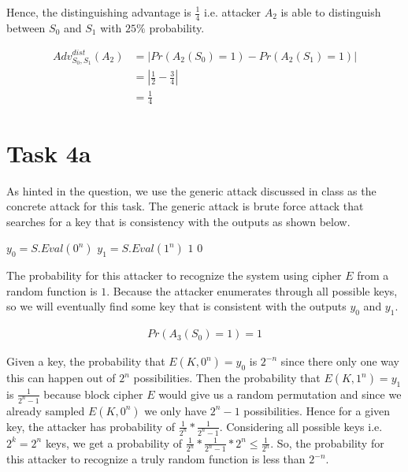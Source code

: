 \documentclass{article}
\begin{document}
    Hence, the distinguishing advantage is $\frac{1}{4}$ i.e. attacker $A_2$ is able to distinguish between $S_0$ and $S_1$ with $25\%$ probability.

    \begin{align*}
        Adv_{S_0,S_1}^{dist}(A_2)   & = |Pr(A_2(S_0) = 1) - Pr(A_2(S_1) = 1)| \\
                                    & = |\frac{1}{2} - \frac{3}{4}| \\
                                    & = \frac{1}{4}
    \end{align*}

    \section*{Task 4a}
    As hinted in the question, we use the generic attack discussed in class as the concrete attack for this task. The generic attack is brute force attack that searches for a key that is consistency with the outputs as shown below.

    \begin{algorithm}[H]
        \begin{algorithmic}
                \State $y_0 = S.Eval(0^n)$
                \State $y_1 = S.Eval(1^n)$
                    \State \Return $1$
                \Else
                    \State \Return $0$
                \EndIf
            \EndProcedure
        \end{algorithmic}
    \end{algorithm}

    The probability for this attacker to recognize the system using cipher $E$ from a random function is $1$. Because the attacker enumerates through all possible keys, so we will eventually find some key that is consistent with the outputs $y_0$ and $y_1$.

    \begin{align*}
        Pr(A_3(S_0) = 1) = 1
    \end{align*}

    Given a key, the probability that $E(K, 0^n) = y_0$ is $2^{-n}$ since there only one way this can happen out of $2^n$ possibilities. Then the probability that $E(K, 1^n) = y_1$ is $\frac{1}{2^n-1}$ because block cipher $E$ would give us a random permutation and since we already sampled $E(K, 0^n)$ we only have $2^n-1$ possibilities. Hence for a given key, the attacker has probability of $\frac{1}{2^n} * \frac{1}{2^n-1}$. Considering all possible keys i.e. $2^k = 2^n$ keys, we get a probability of $\frac{1}{2^n} * \frac{1}{2^n-1} * 2^n \le \frac{1}{2^n}$. So, the probability for this attacker to recognize a truly random function is less than $2^{-n}$.
\end{document}
